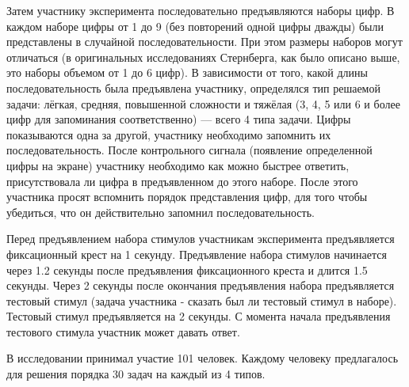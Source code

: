 Затем участнику эксперимента последовательно предъявляются наборы цифр.
В каждом наборе цифры от 1 до 9 (без повторений одной цифры дважды) были представлены в случайной
последовательности. При этом размеры наборов могут отличаться (в оригинальных исследованиях
Стернберга, как было описано выше, это наборы объемом от 1 до 6 цифр). В зависимости от того,
какой длины последовательность была предъявлена участнику, определялся тип решаемой задачи:
лёгкая, средняя, повышенной сложности и тяжёлая (3, 4, 5 или 6 и более цифр для запоминания
соответственно) --- всего 4 типа задачи. Цифры показываются одна
за другой, участнику необходимо запомнить их последовательность. После контрольного сигнала
(появление определенной цифры на экране) участнику необходимо как можно быстрее ответить,
присутствовала ли цифра в предъявленном до этого наборе. После этого участника просят вспомнить
порядок представления цифр, для того чтобы убедиться, что он действительно запомнил
последовательность.

Перед предъявлением набора стимулов участникам эксперимента предъявляется фиксационный крест
на 1 секунду. Предъявление набора стимулов начинается через 1.2 секунды после предъявления
фиксационного креста и длится 1.5 секунды. Через 2 секунды после окончания предъявления набора
предъявляется тестовый стимул (задача участника - сказать был ли тестовый стимул в наборе).
Тестовый стимул предъявляется на 2 секунды. С момента начала предъявления тестового стимула
участник может давать ответ.

В исследовании принимал участие 101 человек. Каждому человеку предлагалось для решения порядка
30 задач на каждый из 4 типов.